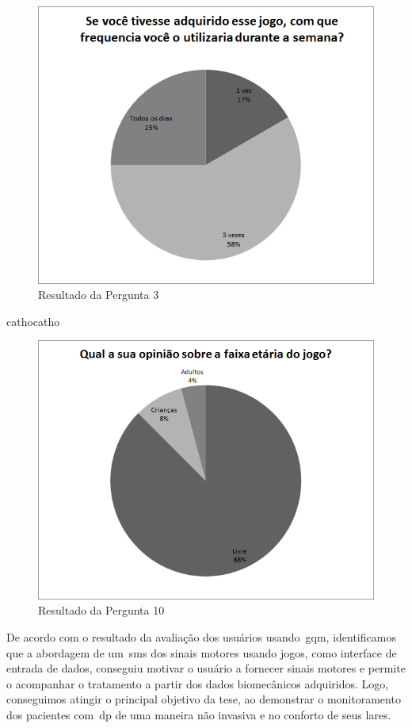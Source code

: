 \begin{figure}[!htb]
     \centering
     \includegraphics[scale=0.7]{./img/chart_3-.png}
     \caption{Resultado da Pergunta 3}
     \label{fig:question3}
\end{figure}
cathocatho

\begin{figure}[!htb]
     \centering
     \includegraphics[scale=0.7]{./img/chart_10-.png}
     \caption{Resultado da Pergunta 10}
     \label{fig:question10}
\end{figure}
\FloatBarrier

De acordo com o resultado da avaliação dos usuários usando~\ac{gqm}, identificamos que a abordagem de um~\ac{sms} dos sinais motores usando jogos, como interface de entrada de dados, conseguiu motivar o usuário  a fornecer sinais motores e permite o acompanhar o tratamento a partir dos dados biomecânicos adquiridos. Logo, conseguimos atingir o principal objetivo da tese, ao demonstrar o monitoramento dos pacientes com~\ac{dp} de uma maneira não invasiva e no conforto de seus lares.





